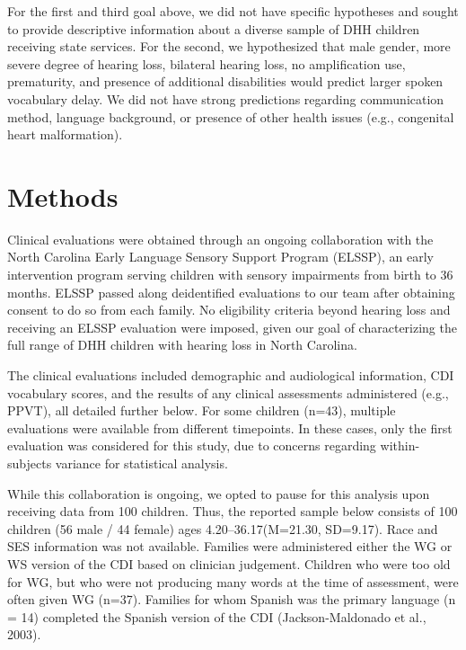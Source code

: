 \documentclass[english,man]{apa6}
\begin{document}
For the first and third goal above, we did not have specific hypotheses and sought to provide descriptive information about a diverse sample of DHH children receiving state services. For the second, we hypothesized that male gender, more severe degree of hearing loss, bilateral hearing loss, no amplification use, prematurity, and presence of additional disabilities would predict larger spoken vocabulary delay. We did not have strong predictions regarding communication method, language background, or presence of other health issues (e.g., congenital heart malformation).

\hypertarget{methods}{%
\section{Methods}\label{methods}}

Clinical evaluations were obtained through an ongoing collaboration with the North Carolina Early Language Sensory Support Program (ELSSP), an early intervention program serving children with sensory impairments from birth to 36 months. ELSSP passed along deidentified evaluations to our team after obtaining consent to do so from each family. No eligibility criteria beyond hearing loss and receiving an ELSSP evaluation were imposed, given our goal of characterizing the full range of DHH children with hearing loss in North Carolina.

The clinical evaluations included demographic and audiological information, CDI vocabulary scores, and the results of any clinical assessments administered (e.g., PPVT), all detailed further below. For some children (n=43), multiple evaluations were available from different timepoints. In these cases, only the first evaluation was considered for this study, due to concerns regarding within-subjects variance for statistical analysis.

While this collaboration is ongoing, we opted to pause for this analysis upon receiving data from 100 children. Thus, the reported sample below consists of 100 children (56 male / 44 female) ages 4.20--36.17(M=21.30, SD=9.17). Race and SES information was not available. Families were administered either the WG or WS version of the CDI based on clinician judgement. Children who were too old for WG, but who were not producing many words at the time of assessment, were often given WG (n=37). Families for whom Spanish was the primary language (n = 14) completed the Spanish version of the CDI (Jackson-Maldonado et al., 2003).
\end{document}
